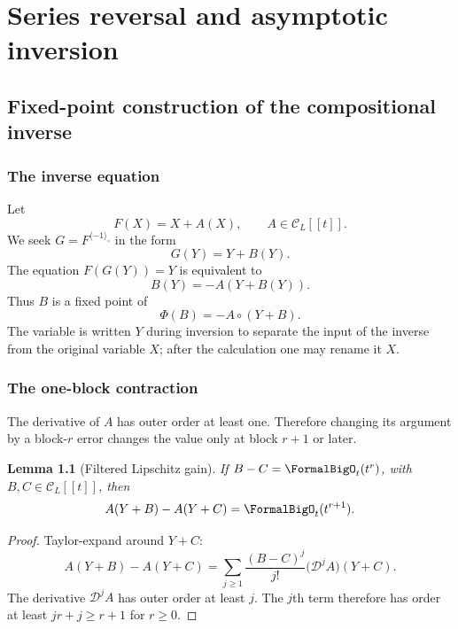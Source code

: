 \documentclass[11pt,oneside]{book}
\newtheorem{lemma}[theorem]{Lemma}
\theoremstyle{definition}
\theoremstyle{remark}
\newcommand{\D}{\mathcal D}
\newcommand{\compinv}{^{\langle-1\rangle_{\circ}}}
\newcommand{\compose}{\mathbin{\circ}}
\begin{document}
\part{Series reversal and asymptotic inversion}
\label{part:reversion}

\chapter{Fixed-point construction of the compositional inverse}
\label{ch:reversion-fixed}

\section{The inverse equation}
Let
\begin{equation}\label{eq:F-near-id-reversion}
 F(X)=X+A(X),
 \qquad A\in\mathcal C_L[[t]].
\end{equation}
We seek $G=F\compinv$ in the form
\[
 G(Y)=Y+B(Y).
\]
The equation $F(G(Y))=Y$ is equivalent to
\begin{equation}\label{eq:inverse-fixed-B}
 B(Y)=-A(Y+B(Y)).
\end{equation}
Thus $B$ is a fixed point of
\begin{equation}\label{eq:Phi-inverse}
 \Phi(B)=-A\compose(Y+B).
\end{equation}
The variable is written $Y$ during inversion to separate the input of the
inverse from the original variable $X$; after the calculation one may rename
it $X$.

\section{The one-block contraction}
The derivative of $A$ has outer order at least one.  Therefore changing its
argument by a block-$r$ error changes the value only at block $r+1$ or later.

\begin{lemma}[Filtered Lipschitz gain]\label{lem:inverse-contraction}
If $B-C=\FormalBigO_t(t^r)$, with $B,C\in\mathcal C_L[[t]]$, then
\begin{equation}\label{eq:inverse-contraction}
 A(Y+B)-A(Y+C)=\FormalBigO_t(t^{r+1}).
\end{equation}
\end{lemma}
\begin{proof}
Taylor-expand around $Y+C$:
\[
 A(Y+B)-A(Y+C)
 =\sum_{j\ge1}\frac{(B-C)^j}{j!}
 \bigl(\D^jA\bigr)(Y+C).
\]
The derivative $\D^jA$ has outer order at least $j$.  The $j$th term therefore
has order at least $jr+j\ge r+1$ for $r\ge0$.
\end{proof}
\end{document}
